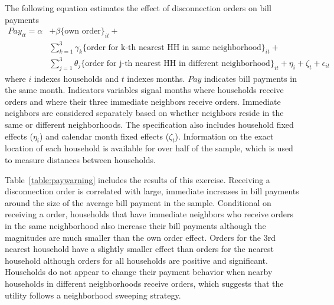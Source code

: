 \documentclass[12pt]{article}
\begin{document}
The following equation estimates the effect of disconnection orders on bill payments
\begin{align*}
Pay_{it} = \alpha &+ \beta  \{ \text{own order} \}_{it} + \\
 &\sum_{k=1}^{3} \gamma_k \{ \text{order for k-th nearest HH in same neighborhood} \}_{it} +  \\
 &\sum_{j=1}^{3} \theta_j \{ \text{order for j-th nearest HH in different neighborhood} \}_{it} + \eta_i + \zeta_t + \epsilon_{it}
\end{align*}
where $i$ indexes households and $t$ indexes months.  $Pay$ indicates bill payments in the same month.  Indicators variables signal months where households receive orders and where their three immediate neighbors receive orders.  Immediate neighbors are considered separately based on whether neighbors reside in the same or different neighborhoods.  The specification also includes household fixed effects ($\eta_i$) and calendar month fixed effects ($\zeta_t$).  Information on the exact location of each household is available for over half of the sample, which is used to measure distances between households.

Table~\ref{table:paywarning} includes the results of this exercise.  Receiving a disconnection order is correlated with large, immediate increases in bill payments around the size of the average bill payment in the sample.  Conditional on receiving a order, households that have immediate neighbors who receive orders in the same neighborhood also increase their bill payments although the magnitudes are much smaller than the own order effect.  Orders for the 3rd nearest household have a slightly smaller effect than orders for the nearest household although orders for all households are positive and significant.  Households do not appear to change their payment behavior when nearby households in different neighborhoods receive orders, which suggests that the utility follows a neighborhood sweeping strategy.
\end{document}

